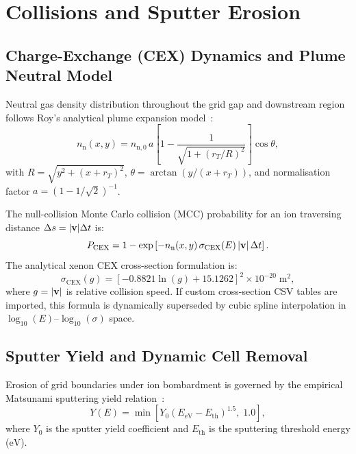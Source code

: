 \documentclass[11pt,a4paper]{article}
\begin{document}
\section{Collisions and Sputter Erosion}

\subsection{Charge-Exchange (CEX) Dynamics and Plume Neutral Model}

Neutral gas density distribution throughout the grid gap and downstream region follows Roy's analytical plume expansion model~\cite{roy}:
\begin{equation}
    n_{\mathrm{n}}(x,y) = n_{\mathrm{n},0} \, a \left[1 - \frac{1}{\sqrt{1 + (r_T / R)^2}}\right] \cos\theta,
\end{equation}
with $R = \sqrt{y^2 + (x + r_T)^2}$, $\theta = \arctan(y / (x + r_T))$, and normalisation factor $a = (1 - 1/\sqrt{2})^{-1}$.

The null-collision Monte Carlo collision (MCC) probability for an ion traversing distance $\Delta s = |\vb{v}|\Delta t$ is:
\begin{equation}
    P_{\mathrm{CEX}} = 1 - \exp\left[-n_{\mathrm{n}}(x,y) \, \sigma_{\mathrm{CEX}}(E) \, |\vb{v}| \, \Delta t\right].
\end{equation}
The analytical xenon CEX cross-section formulation is:
\begin{equation}
    \sigma_{\mathrm{CEX}}(g) = \left[-0.8821\ln(g) + 15.1262\right]^2 \times 10^{-20} \;\si{\meter\squared},
\end{equation}
where $g = |\vb{v}|$ is relative collision speed. If custom cross-section CSV tables are imported, this formula is dynamically superseded by cubic spline interpolation in $\log_{10}(E)$--$\log_{10}(\sigma)$ space.

\subsection{Sputter Yield and Dynamic Cell Removal}

Erosion of grid boundaries under ion bombardment is governed by the empirical Matsunami sputtering yield relation~\cite{matsunami}:
\begin{equation}
    Y(E) = \min\!\left[Y_0 \left(E_{\mathrm{eV}} - E_{\mathrm{th}}\right)^{1.5},\; 1.0\right],
\end{equation}
where $Y_0$ is the sputter yield coefficient and $E_{\mathrm{th}}$ is the sputtering threshold energy ($\si{\eV}$).
\end{document}
